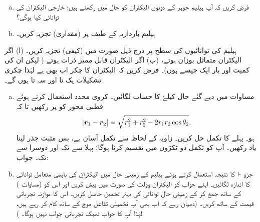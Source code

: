 \begin{enumerate}[a.]
\item
فرض کریں کہ آپ ہیلیم  جوہر کے دونوں الیکٹران کو  حال میں رکھتے ہیں؛ خارجی  الیکٹران کی توانائی کیا ہوگی؟
\item
ہیلیم بارداریہ  کے طیف پر  (مقداری)  تجزیہ کریں۔ 
\end{enumerate}
ہیلیم کی توانائیوں کی سطح پر درج ذیل صورت میں (کیفی) تجزیہ کریں۔ (ا) اگر الیکٹران متماثل بوزان ہوتے،  (ب) اگر الیکٹران قابل ممیز ذرات  ہوتے ( لیکن   ان کی کمیت اور بار  ایک جیسے ہوں)۔ فرض کریں کہ الیکٹران کا چکر اب بھی   ہے  لہٰذا   چکری  تشکیلات یک تا اور سہ تا ہوں  گے۔
\begin{enumerate}[a.]
\item
مساوات     میں دیے گئے  حال   کیلۓ   کا حساب لگائیں۔   کروی محدد استعمال کرتے ہوئے قطبی محور کو  پر رکھیں  تا کہ
\begin{align}
|{{\boldsymbol{r}}}_{1}-{{\boldsymbol{r}}}_{2}|= \sqrt{r_1^2+ r_2^2 -2r_{1} r_{2}\cos\theta_{2}}.
\end{align}
ہو۔ پہلے     کا تکمل حل کریں۔ زاویہ        کے لحاظ سے تکمل آسان ہے، بس مثبت جذر لینا  یاد رکھیں۔ آپ کو           تکمل دو ٹکڑوں میں تقسیم کرنا ہوگا؛ پہلا سے            تک اور دوسرا        سے  تک۔ جواب:  
\item
جزو -ا  کا نتیجہ استعمال کرتے ہوئے ہیلیم کے زمینی حال میں الیکٹران کی باہمی متعامل توانائی کا اندازہ لگائیں۔ اپنے جواب کو الیکٹران وولٹ کی صورت میں پیش کریں اور اس کو  (مساوات  )  کے ساتھ جمع کر کے زمینی حال توانائی کی بہتر تخمین  حاصل کریں۔ اس کا موازنہ تجرباتی قیمت کے ساتھ کریں۔ (دھیان رہے کہ اب بھی آپ تخمینی تفاعل موج کے ساتھ کام کر رہے ہیں،  لہٰذا آپ کا جواب ٹھیک تجرباتی جواب نہیں ہوگا۔  )
\end{enumerate}

